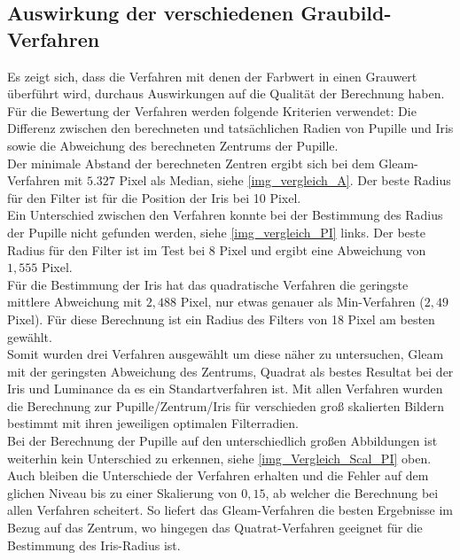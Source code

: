 \subsection{Auswirkung der verschiedenen Graubild-Verfahren}
\label{grau_Auswirkung_ElSe}
Es zeigt sich, dass die Verfahren mit denen der Farbwert in einen Grauwert überführt wird, durchaus Auswirkungen auf die Qualität der Berechnung haben.\\
Für die Bewertung der Verfahren werden folgende Kriterien verwendet: Die Differenz zwischen den berechneten und tatsächlichen Radien von Pupille und Iris sowie die Abweichung des berechneten Zentrums der Pupille.\\
Der minimale Abstand der berechneten Zentren ergibt sich bei dem Gleam-Verfahren mit $5.327$ Pixel als Median, siehe \autoref{img_vergleich_A}. Der beste Radius für den Filter ist für die Position der Iris bei 10 Pixel.\\
Ein Unterschied zwischen den Verfahren konnte bei der Bestimmung des Radius der Pupille nicht gefunden werden, siehe \autoref{img_vergleich_PI} links. Der beste Radius für den Filter ist im Test bei 8 Pixel und ergibt eine Abweichung von $1,555$ Pixel.\\
Für die Bestimmung der Iris hat das quadratische Verfahren die geringste mittlere Abweichung mit $2,488$ Pixel, nur etwas genauer als Min-Verfahren ($2,49$ Pixel). Für diese Berechnung ist ein Radius des Filters von 18 Pixel am besten gewählt.\\
Somit wurden drei Verfahren ausgewählt um diese näher zu untersuchen, Gleam mit der geringsten Abweichung des Zentrums, Quadrat als bestes Resultat bei der Iris und Luminance da es ein Standartverfahren ist. Mit allen Verfahren wurden die Berechnung zur Pupille/Zentrum/Iris für verschieden groß skalierten Bildern bestimmt mit ihren jeweiligen optimalen Filterradien.\\
Bei der Berechnung der Pupille auf den unterschiedlich großen Abbildungen ist weiterhin kein Unterschied zu erkennen, siehe \autoref{img_Vergleich_Scal_PI} oben.\\
Auch bleiben die Unterschiede der Verfahren erhalten und die Fehler auf dem glichen Niveau bis zu einer Skalierung von $0,15$, ab welcher die Berechnung bei allen Verfahren scheitert. So liefert das Gleam-Verfahren die besten Ergebnisse im Bezug auf das Zentrum, wo hingegen das Quatrat-Verfahren geeignet für die Bestimmung des Iris-Radius ist.
